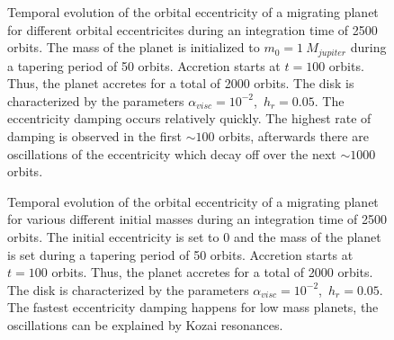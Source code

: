       \begin{figure}[h!]
        \centering
        \begin{minipage}{.5\linewidth}
          \centering
        \end{minipage}%
        \begin{minipage}{.5\linewidth}
          \centering
        \end{minipage}
        \caption{
            Temporal evolution of the orbital eccentricity of a 
            migrating planet for different orbital eccentricites 
            during an integration time of 2500 orbits. 
            The mass of the planet is initialized to $m_0=1\ M_{jupiter}$
            during a tapering period of 50 orbits. Accretion starts at
            $t=100$ orbits. Thus, the planet accretes for a total of 
            2000 orbits.
            The disk is characterized by the parameters 
            $\alpha_{visc}=10^{-2}$,\ $h_r=0.05$.
            The eccentricity damping occurs relatively quickly. The highest 
            rate of damping is observed in the first $\sim100$ orbits, 
            afterwards there are oscillations of the eccentricity which decay 
            off over the next $\sim1000$ orbits.
        }
        \label{fig:ecc_vs_t_and_e0}
      \end{figure}

      \begin{figure}[h!]
        \centering
        \begin{minipage}{.5\linewidth}
          \centering
        \end{minipage}%
        \begin{minipage}{.5\linewidth}
          \centering
        \end{minipage}
          \caption{
            Temporal evolution of the orbital eccentricity of a 
            migrating planet for various different initial masses 
            during an integration time of 2500 orbits. The initial 
            eccentricity is set to 0 and the mass of the planet is set 
            during a tapering period of 50 orbits. Accretion starts at
            $t=100$ orbits. Thus, the planet accretes for a total of
            2000 orbits.
            The disk is characterized by the parameters 
            $\alpha_{visc}=10^{-2}$,\ $h_r=0.05$.
            The fastest eccentricity damping happens for low mass planets, the 
            oscillations can be explained by Kozai resonances.
        }
        \label{fig:ecc_vs_t_and_m0}
      \end{figure}

